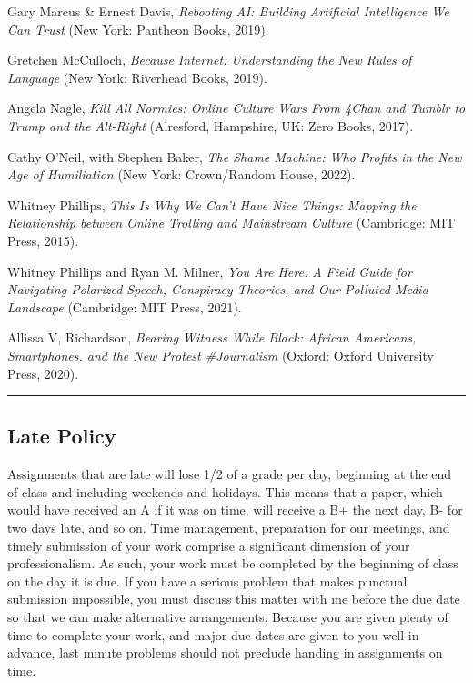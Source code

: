 \documentclass[
  letterpaper,
  DIV=11,
  numbers=noendperiod]{scrartcl}
\begin{document}
Gary Marcus \& Ernest Davis, \emph{Rebooting AI: Building Artificial
Intelligence We Can Trust} (New York: Pantheon Books, 2019).

Gretchen McCulloch, \emph{Because Internet: Understanding the New Rules
of Language} (New York: Riverhead Books, 2019).

Angela Nagle, \emph{Kill All Normies: Online Culture Wars From 4Chan and
Tumblr to Trump and the Alt-Right} (Alresford, Hampshire, UK: Zero
Books, 2017).

Cathy O'Neil, with Stephen Baker, \emph{The Shame Machine: Who Profits
in the New Age of Humiliation} (New York: Crown/Random House, 2022).

Whitney Phillips, \emph{This Is Why We Can't Have Nice Things: Mapping
the Relationship between Online Trolling and Mainstream Culture}
(Cambridge: MIT Press, 2015).

Whitney Phillips and Ryan M. Milner, \emph{You Are Here: A Field Guide
for Navigating Polarized Speech, Conspiracy Theories, and Our Polluted
Media Landscape} (Cambridge: MIT Press, 2021).

Allissa V, Richardson, \emph{Bearing Witness While Black: African
Americans, Smartphones, and the New Protest \#Journalism} (Oxford:
Oxford University Press, 2020).

\begin{center}\rule{0.5\linewidth}{0.5pt}\end{center}

\hypertarget{late-policy}{%
\subsection{Late Policy}\label{late-policy}}

Assignments that are late will lose 1/2 of a grade per day, beginning at
the end of class and including weekends and holidays. This means that a
paper, which would have received an A if it was on time, will receive a
B+ the next day, B- for two days late, and so on. Time management,
preparation for our meetings, and timely submission of your work
comprise a significant dimension of your professionalism. As such, your
work must be completed by the beginning of class on the day it is due.
If you have a serious problem that makes punctual submission impossible,
you must discuss this matter with me before the due date so that we can
make alternative arrangements. Because you are given plenty of time to
complete your work, and major due dates are given to you well in
advance, last minute problems should not preclude handing in assignments
on time.
\end{document}
